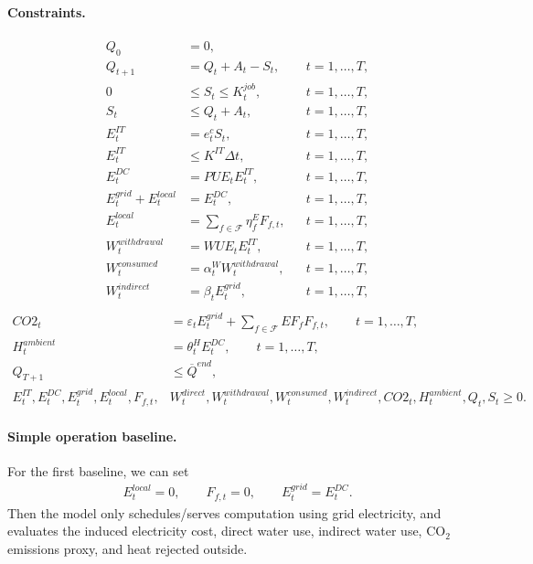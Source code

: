 \documentclass{article}
\begin{document}
\paragraph{Constraints.}
\begin{align}
    Q_0 &= 0, \\
    Q_{t+1} &= Q_t + A_t - S_t, && t=1,\ldots,T, \label{eq:queue_opt}\\
    0 &\leq S_t \leq K_t^{job}, && t=1,\ldots,T, \\
    S_t &\leq Q_t + A_t, && t=1,\ldots,T, \\
    E_t^{IT} &= e_t^c S_t, && t=1,\ldots,T, \\
    E_t^{IT} &\leq K^{IT}\Delta t, && t=1,\ldots,T, \\
    E_t^{DC} &= PUE_t E_t^{IT}, && t=1,\ldots,T, \\
    E_t^{grid}+E_t^{local} &= E_t^{DC}, && t=1,\ldots,T, \\
    E_t^{local} &= \sum_{f\in\mathcal{F}} \eta_f^E F_{f,t}, && t=1,\ldots,T, \\
    W_t^{withdrawal} &= WUE_t E_t^{IT}, && t=1,\ldots,T, \\
    W_t^{consumed} &= \alpha_t^W W_t^{withdrawal}, && t=1,\ldots,T, \\
    W_t^{indirect} &= \beta_t E_t^{grid}, && t=1,\ldots,T, \\
    \end{align}
\begin{align}
    CO2_t &= \varepsilon_t E_t^{grid} + \sum_{f\in\mathcal{F}} EF_f F_{f,t}, \qquad t=1,\ldots,T,  \\
    H_t^{ambient} &= \theta_t^H E_t^{DC}, \qquad t=1,\ldots,T, \\
    Q_{T+1} &\leq \overline{Q}^{end}, \\ E_t^{IT},E_t^{DC},E_t^{grid},E_t^{local},F_{f,t},&W_t^{direct},W_t^{withdrawal},W_t^{consumed},W_t^{indirect},CO2_t,H_t^{ambient},Q_t,S_t \geq 0.
\end{align}



\paragraph{Simple operation baseline.}
For the first baseline, we can set
\begin{align*}
    E_t^{local}=0,\qquad F_{f,t}=0,\qquad E_t^{grid}=E_t^{DC}.
\end{align*}
Then the model only schedules/serves computation using grid electricity, and evaluates the induced electricity cost, direct water use, indirect water use, CO$_2$ emissions proxy, and heat rejected outside.
\end{document}
